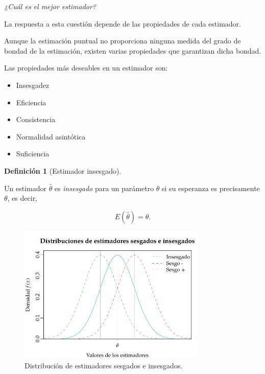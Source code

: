 \documentclass[
  a4paper,
]{scrreport}
\providecommand{\tightlist}{%
  \setlength{\itemsep}{0pt}\setlength{\parskip}{0pt}}\usepackage{longtable,booktabs,array}
\theoremstyle{definition}
\newtheorem{definition}{Definición}[chapter]
\theoremstyle{definition}
\theoremstyle{plain}
\theoremstyle{remark}
\begin{document}
\emph{¿Cuál es el mejor estimador?}

La respuesta a esta cuestión depende de las propiedades de cada
estimador.

Aunque la estimación puntual no proporciona ninguna medida del grado de
bondad de la estimación, existen varias propiedades que garantizan dicha
bondad.

Las propiedades más deseables en un estimador son:

\begin{itemize}
\tightlist
\item
  Insesgadez
\item
  Eficiencia
\item
  Consistencia
\item
  Normalidad asintótica
\item
  Suficiencia
\end{itemize}

\begin{definition}[Estimador
insesgado]\protect\hypertarget{def-estimador-insesgado}{}\label{def-estimador-insesgado}

Un estimador \(\hat \theta\) es \emph{insesgado} para un parámetro
\(\theta\) si su esperanza es precisamente \(\theta\), es decir,

\[
E(\hat \theta)=\theta.
\]

\end{definition}

\begin{figure}

{\centering \includegraphics[width=0.8\textwidth,height=\textheight]{img/estimacion/estimadores-sesgados-insesgados.pdf}

}

\caption{Distribución de estimadores sesgados e insesgados.}

\end{figure}
\end{document}
